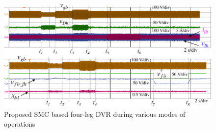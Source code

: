 \begin{figure}[t!]   
	\centering
	\includegraphics[scale=1]{figures/Chapter_5/Mine/Various_modes}
	\caption{Proposed SMC based four-leg DVR during various modes of operations} %
	\label{fig5.12}
\end{figure} 

